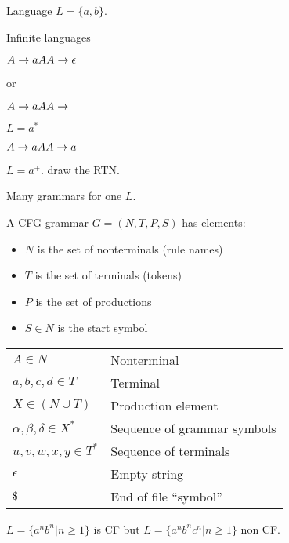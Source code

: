 \documentclass[11pt,twocolumn,nocopyright]{sigplanconf}
\begin{document}
Language $L = \{a,b\}$.

 Infinite languages
 
 \noindent $
A \rightarrow a A \\
A \rightarrow \epsilon \\
$

or

 \noindent $
A \rightarrow a A \\
A \rightarrow \\
$

$L = {a^*}$

\noindent $
A \rightarrow a A \\
A \rightarrow a\\
$

$L = {a^+}$. draw the RTN.

Many grammars for one $L$.

A  CFG grammar $G = (N, T, P, S)$ has elements:

\vspace{-3pt}
\begin{itemize}\itemsep0pt \parskip0pt 
\item $N$ is the set of nonterminals (rule names)
\item $T$ is the set of terminals (tokens)
\item $P$ is the set of productions
\item $S \in N$ is the start symbol
\end{itemize}

\begin{center}\small 
\begin{tabular}{l  l}
$A  \in N$		    & Nonterminal \\
$a,b,c,d  \in T$ 	    & Terminal \\
$X  \in (N \cup T)  $ & Production element \\
$\alpha, \beta, \delta \in X^*$  & Sequence of grammar symbols\\
$u,v,w,x,y \in T^*$             & Sequence of terminals\\
$\epsilon$ & Empty string \\
$\char36$ & End of file ``symbol'' \\
\end{tabular}
\end{center}


$L = \{a^nb^n | n \ge 1\}$ is CF but $L = \{a^nb^nc^n | n \ge 1\}$ non CF.
\end{document}
